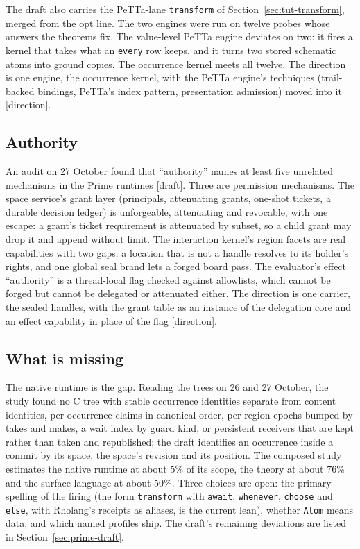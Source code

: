 \documentclass[11pt]{article}
\newcommand{\code}[1]{\texttt{#1}}
\newcommand{\kind}[1]{\textsf{\small[#1]}}
\newcommand{\PeTTa}{\textup{PeTTa}}
\begin{document}
The draft also carries the \PeTTa{}-lane \code{transform} of
Section~\ref{sec:tut-transform}, merged from the opt line.  The two engines
were run on twelve probes whose answers the theorems fix.  The value-level
\PeTTa{} engine deviates on two: it fires a kernel that takes what an
\code{every} row keeps, and it turns two stored schematic atoms into ground
copies.  The occurrence kernel meets all twelve.  The direction is one engine,
the occurrence kernel, with the \PeTTa{} engine's techniques (trail-backed
bindings, \PeTTa{}'s index pattern, presentation admission) moved into it
\kind{direction}.

\subsection{Authority}

An audit on 27 October found that ``authority'' names at least five unrelated
mechanisms in the Prime runtimes \kind{draft}.  Three are permission
mechanisms.  The space service's grant layer (principals, attenuating grants,
one-shot tickets, a durable decision ledger) is unforgeable, attenuating and
revocable, with one escape: a grant's ticket requirement is attenuated by
subset, so a child grant may drop it and append without limit.  The
interaction kernel's region facets are real capabilities with two gaps: a
location that is not a handle resolves to its holder's rights, and one global
seal brand lets a forged board pass.  The evaluator's effect ``authority'' is
a thread-local flag checked against allowlists, which cannot be forged but
cannot be delegated or attenuated either.  The direction is one carrier, the
sealed handles, with the grant table as an instance of the delegation core and
an effect capability in place of the flag \kind{direction}.

\subsection{What is missing}

The native runtime is the gap.  Reading the trees on 26 and 27 October, the
study found no C tree with stable occurrence identities separate from content
identities, per-occurrence claims in canonical order, per-region epochs bumped
by takes and makes, a wait index by guard kind, or persistent receivers that
are kept rather than taken and republished; the draft identifies an occurrence
inside a commit by its space, the space's revision and its position.  The
composed study estimates the native runtime at about 5\% of its scope, the
theory at about 76\% and the surface language at about 50\%.  Three choices
are open: the primary spelling of the firing (the form \code{transform} with
\code{await}, \code{whenever}, \code{choose} and \code{else}, with Rholang's
receipts as aliases, is the current lean), whether \code{Atom} means data, and
which named profiles ship.  The draft's remaining deviations are listed in
Section~\ref{sec:prime-draft}.
\end{document}
